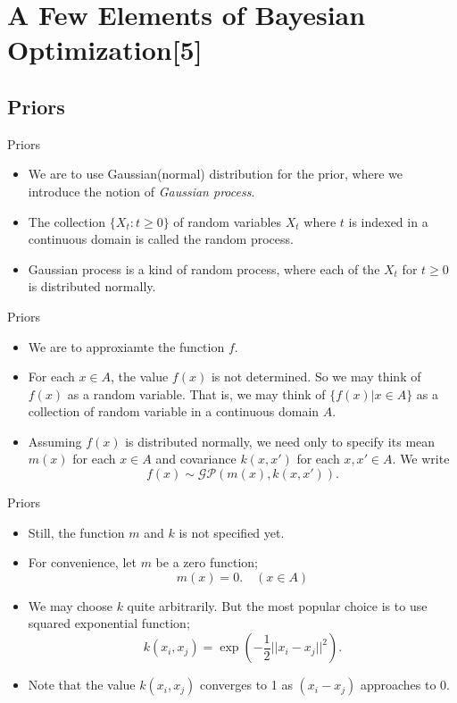 \documentclass{beamer}
\begin{document}
\section{A Few Elements of Bayesian Optimization[5]}

\subsection{Priors}
\begin{frame}{Priors}
\begin{itemize}
\item
We are to use Gaussian(normal) distribution for the prior, where we introduce the notion of \emph{Gaussian process}.
\item
The collection \(\{X_t:t\ge0\}\) of random variables \(X_t\) where \(t\) is indexed in a continuous domain is called the \alert{random process}.
\item
\alert{Gaussian process} is a kind of random process, where each of the \(X_t\) for \(t\ge0\) is distributed normally.
\end{itemize}
\end{frame}

\begin{frame}{Priors}
\begin{itemize}
\item
We are to approxiamte the function \(f\).
\item
For each \(x\in A\), the value \(f(x)\) is not determined.
So we may think of \(f(x)\) as a random variable.
That is, we may think of \(\{f(x)|x\in A\}\) as a collection of random variable in a continuous domain \(A\).
\item
Assuming \(f(x)\) is distributed normally, we need only to specify its mean \(m(x)\) for each \(x\in A\) and covariance \(k(x,x')\) for each \(x,x'\in A\).
We write
\[f(x)\sim \mathcal G\mathcal P(m(x),k(x,x')).\]
\end{itemize}
\end{frame}

\begin{frame}{Priors}
\begin{itemize}
\item
Still, the function \(m\) and \(k\) is not specified yet.
\item
For convenience, let \(m\) be a zero function;
\[m(x)=0.\quad(x\in A)\]
\item
We may choose \(k\) quite arbitrarily.
But the most popular choice is to use squared exponential function;
\[k(x_i,x_j)=\exp\left(-\frac12||x_i-x_j||^2\right).\]
\item
Note that the value \(k(x_i,x_j)\) converges to 1 as \((x_i-x_j)\) approaches to 0.
\end{itemize}
\end{frame}
\end{document}
